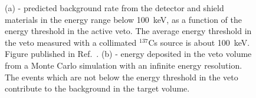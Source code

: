 \begin{figure}[!t]
\caption[Predicted background rate from the detector and shield materials in the energy range below 100~keV, as a function of the energy threshold in the active veto]{(a) - predicted background rate from the detector and shield materials in the energy range below 100~keV, as a function of the energy threshold in the active veto. The average energy threshold in the veto measured with a collimated $^{137}$Cs source is about 100~keV. Figure published in Ref.~\cite{EMBG}. (b) - energy deposited in the veto volume from a Monte Carlo simulation with an infinite energy resolution. The events which are not below the energy threshold in the veto contribute to the background in the target volume.}
\label{figVetoCuts}
\end{figure}


